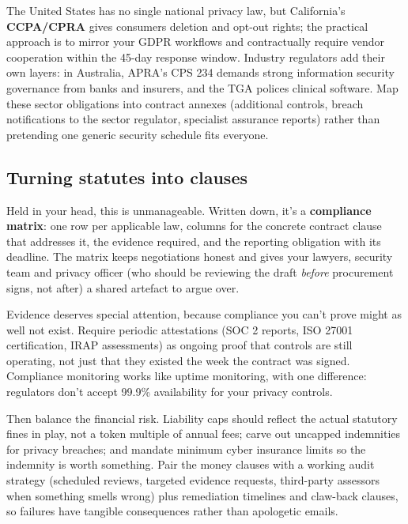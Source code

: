 The United States has no single national privacy law, but California's \textbf{CCPA/CPRA} gives consumers deletion and opt-out rights; the practical approach is to mirror your GDPR workflows and contractually require vendor cooperation within the 45-day response window. Industry regulators add their own layers: in Australia, APRA's CPS 234 demands strong information security governance from banks and insurers, and the TGA polices clinical software. Map these sector obligations into contract annexes (additional controls, breach notifications to the sector regulator, specialist assurance reports) rather than pretending one generic security schedule fits everyone.



\subsection{Turning statutes into clauses}


Held in your head, this is unmanageable. Written down, it's a \textbf{compliance matrix}: one row per applicable law, columns for the concrete contract clause that addresses it, the evidence required, and the reporting obligation with its deadline. The matrix keeps negotiations honest and gives your lawyers, security team and privacy officer (who should be reviewing the draft \emph{before} procurement signs, not after) a shared artefact to argue over.


Evidence deserves special attention, because compliance you can't prove might as well not exist. Require periodic attestations (SOC 2 reports, ISO 27001 certification, IRAP assessments) as ongoing proof that controls are still operating, not just that they existed the week the contract was signed. Compliance monitoring works like uptime monitoring, with one difference: regulators don't accept 99.9\% availability for your privacy controls.


Then balance the financial risk. Liability caps should reflect the actual statutory fines in play, not a token multiple of annual fees; carve out uncapped indemnities for privacy breaches; and mandate minimum cyber insurance limits so the indemnity is worth something. Pair the money clauses with a working audit strategy (scheduled reviews, targeted evidence requests, third-party assessors when something smells wrong) plus remediation timelines and claw-back clauses, so failures have tangible consequences rather than apologetic emails.



